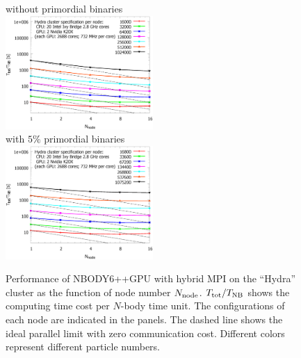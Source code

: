 \documentclass[usenatbib,aas_macros]{mn2e}
\def\nbodyppgpu{NBODY6++GPU }
\def\nb{$N$-body }
\begin{document}
\begin{figure}
  \centering
  without primordial binaries\\
  \includegraphics[width=0.5\textwidth,height=!]{ttotal.0.eps}\\
  with $5\%$ primordial binaries\\
  \includegraphics[width=0.5\textwidth,height=!]{ttotal.0.05.eps}
  \caption{Performance of \nbodyppgpu with hybrid MPI on the ``Hydra'' cluster as the function of node number $N_{\rm node}$. 
    $T_{\rm tot}/T_{\rm NB}$ shows the computing time cost per \nb time unit.
    The configurations of each node are indicated in the panels. The dashed line shows the
    ideal parallel limit with zero communication cost. Different colors represent different particle numbers.}
  \label{fig:scaling}
\end{figure}
\end{document}
